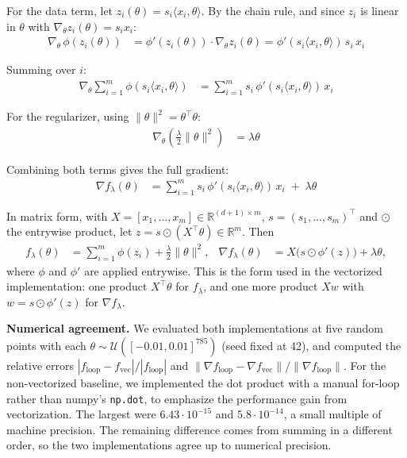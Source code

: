 \documentclass[12pt]{article}
\begin{document}
For the data term, let $z_i(\theta) = s_i\langle x_i,\theta\rangle$. By the chain rule, and since $z_i$ is linear in $\theta$ with $\nabla_\theta z_i(\theta) = s_i x_i$:
\begin{align*}
\nabla_\theta\, \phi(z_i(\theta)) &= \phi'(z_i(\theta))\cdot \nabla_\theta z_i(\theta) = \phi'(s_i\langle x_i,\theta\rangle)\, s_i\, x_i
\end{align*}

Summing over $i$:
\begin{align*}
\nabla_\theta \sum_{i=1}^m \phi(s_i\langle x_i,\theta\rangle) &= \sum_{i=1}^m s_i\, \phi'(s_i\langle x_i,\theta\rangle)\, x_i
\end{align*}

For the regularizer, using $\|\theta\|^2 = \theta^\top\theta$:
\begin{align*}
\nabla_\theta\left(\frac{\lambda}{2}\|\theta\|^2\right) &= \lambda\theta
\end{align*}

Combining both terms gives the full gradient:
\begin{align*}
\nabla f_\lambda(\theta) &= \sum_{i=1}^m s_i\, \phi'(s_i\langle x_i,\theta\rangle)\, x_i \;+\; \lambda\theta
\end{align*}

In matrix form, with $X = [x_1, \dots, x_m] \in \mathbb{R}^{(d+1)\times m}$,
$s = (s_1, \dots, s_m)^\top$ and $\odot$ the entrywise product, let
$z = s \odot (X^\top \theta) \in \mathbb{R}^m$. Then
\begin{align*}
f_\lambda(\theta) &= \sum_{i=1}^m \phi(z_i) + \frac{\lambda}{2}\|\theta\|^2,
&
\nabla f_\lambda(\theta) &= X\bigl(s \odot \phi'(z)\bigr) + \lambda\theta,
\end{align*}
where $\phi$ and $\phi'$ are applied entrywise. This is the form used in the
vectorized implementation: one product $X^\top\theta$ for $f_\lambda$, and one
more product $Xw$ with $w = s \odot \phi'(z)$ for $\nabla f_\lambda$.

\vspace{1mm}

\textbf{Numerical agreement.}
We evaluated both implementations at five random points with each
$\theta \sim \mathcal{U}([-0.01, 0.01]^{785})$ (seed fixed at 42), and computed the relative errors
$|f_{\text{loop}} - f_{\text{vec}}| / |f_{\text{loop}}|$ and
$\|\nabla f_{\text{loop}} - \nabla f_{\text{vec}}\| / \|\nabla f_{\text{loop}}\|$. For the non-vectorized baseline, we implemented the dot product with a manual for-loop rather than numpy's \texttt{np.dot}, to emphasize the performance gain from vectorization. The largest were $6.43 \cdot 10^{-15}$ and $5.8 \cdot 10^{-14}$, a small multiple of machine precision. The remaining difference comes from summing in a different order, so the two implementations agree up to numerical precision.
\end{document}
